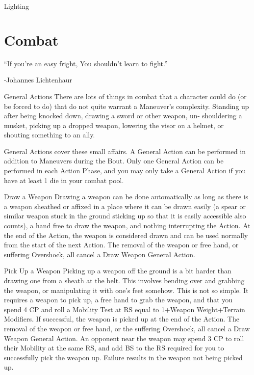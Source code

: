 \documentclass[oneside,11pt,english]{book}
\begin{document}
Lighting 

 

\chapter{Combat}\label{ch:combat}
\startcontents[chapters]
\clearpage

“If you’re an easy fright, 
You shouldn’t learn to fight.” 

-Johannes Lichtenhaur 

 


 

General Actions 
There are lots of things in combat that a character could do (or be forced to do) that do not quite warrant a 
Maneuver’s complexity. Standing up after being knocked down, drawing a sword or other weapon, un-
shouldering a musket, picking up a dropped weapon, lowering the visor on a helmet, or shouting 
something to an ally. 

 

General Actions cover these small affairs. A General Action can be performed in addition to Maneuvers 
during the Bout. Only one General Action can be performed in each Action Phase, and you may only take 
a General Action if you have at least 1 die in your combat pool. 

 

Draw a Weapon 
Drawing a weapon can be done automatically as long as there is a weapon sheathed or affixed in a place 
where it can be drawn easily (a spear or similar weapon stuck in the ground sticking up so that it is easily 
accessible also counts), a hand free to draw the weapon, and nothing interrupting the Action. At the end 
of the Action, the weapon is considered drawn and can be used normally from the start of the next Action. 
The removal of the weapon or free hand, or suffering Overshock, all cancel a Draw Weapon General 
Action. 

 

Pick Up a Weapon 
Picking up a weapon off the ground is a bit harder than drawing one from a sheath at the belt. This 
involves bending over and grabbing the weapon, or manipulating it with one’s feet somehow. This is not 
so simple. It requires a weapon to pick up, a free hand to grab the weapon, and that you spend 4 CP and 
roll a Mobility Test at RS equal to 1+Weapon Weight+Terrain Modifiers. If successful, the weapon is 
picked up at the end of the Action. The removal of the weapon or free hand, or the suffering Overshock, 
all cancel a Draw Weapon General Action. An opponent near the weapon may spend 3 CP to roll their 
Mobility at the same RS, and add BS to the RS required for you to successfully pick the weapon up. 
Failure results in the weapon not being picked up. 
\end{document}
